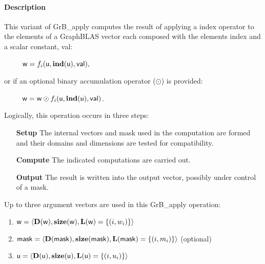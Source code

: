 \paragraph{Description}

This variant of {\sf GrB\_apply} computes the result of applying a index operator
to the elements of a GraphBLAS vector each composed with the elements index and a scalar constant, {\sf val}:
\begin{itemize}[leftmargin=2.1in]
\item[~] ${\sf w} = f_i({\sf u}, \bold{ind}({\sf u}), {\sf val}),$
\end{itemize}
or if an optional binary accumulation operator ($\odot$) is provided:
\begin{itemize}[leftmargin=2.1in]
\item[~] ${\sf w} = {\sf w} \odot f_i({\sf u}, \bold{ind}({\sf u}), {\sf val})$.  
\end{itemize}

Logically, this operation occurs in three steps:
\begin{enumerate}[leftmargin=0.75in]
\item[\bf Setup] The internal vectors and mask used in the computation are formed 
and their domains and dimensions are tested for compatibility.
\item[\bf Compute] The indicated computations are carried out.
\item[\bf Output] The result is written into the output vector, possibly under 
control of a mask.
\end{enumerate}

Up to three argument vectors are used in this {\sf GrB\_apply} operation:
\begin{enumerate}
	\item ${\sf w} = \langle \bold{D}({\sf w}),\bold{size}({\sf w}),
    \bold{L}({\sf w}) = \{(i,w_i) \} \rangle$

	\item ${\sf mask} = \langle \bold{D}({\sf mask}),\bold{size}({\sf mask}),
    \bold{L}({\sf mask}) = \{(i,m_i) \} \rangle$ (optional)

	\item ${\sf u} = \langle \bold{D}({\sf u}),\bold{size}({\sf u}),
    \bold{L}({\sf u}) = \{(i,u_i) \} \rangle$
\end{enumerate}

